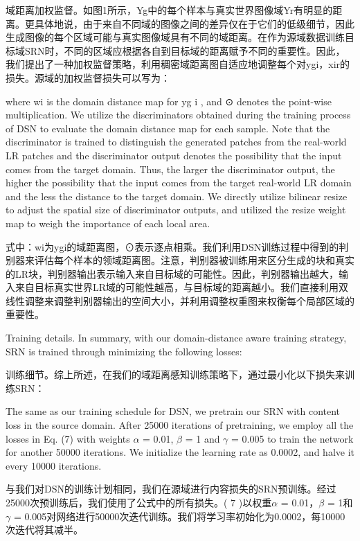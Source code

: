 域距离加权监督。如图1所示，Yg中的每个样本与真实世界图像域Yr有明显的距离。更具体地说，由于来自不同域的图像之间的差异仅在于它们的低级细节，因此生成图像的每个区域可能与真实图像域具有不同的域距离。在作为源域数据训练目标域SRN时，不同的区域应根据各自到目标域的距离赋予不同的重要性。因此，我们提出了一种加权监督策略，利用稠密域距离图自适应地调整每个对{ygi，xir}的损失。源域的加权监督损失可以写为：

where wi is the domain distance map for yg i , and ⊙ denotes the point-wise multiplication. We utilize the discriminators obtained during the training process of DSN to evaluate the domain distance map for each sample. Note that the discriminator is trained to distinguish the generated patches from the real-world LR patches and the discriminator output denotes the possibility that the input comes from the target domain. Thus, the larger the discriminator output, the higher the possibility that the input comes from the target real-world LR domain and the less the distance to the target domain. We directly utilize bilinear resize to adjust the spatial size of discriminator outputs, and utilized the resize weight map to weigh the importance of each local area.

式中：wi为ygi的域距离图，⊙表示逐点相乘。我们利用DSN训练过程中得到的判别器来评估每个样本的领域距离图。注意，判别器被训练用来区分生成的块和真实的LR块，判别器输出表示输入来自目标域的可能性。因此，判别器输出越大，输入来自目标真实世界LR域的可能性越高，与目标域的距离越小。我们直接利用双线性调整来调整判别器输出的空间大小，并利用调整权重图来权衡每个局部区域的重要性。

Training details. In summary, with our domain-distance aware training strategy, SRN is trained through minimizing the following losses:

训练细节。综上所述，在我们的域距离感知训练策略下，通过最小化以下损失来训练SRN：

The same as our training schedule for DSN, we pretrain our SRN with content loss in the source domain. After 25000 iterations of pretraining, we employ all the losses in Eq. (7) with weights $\alpha$ = 0.01, $\beta$ = 1 and $\gamma$ = 0.005 to train the network for another 50000 iterations. We initialize the learning rate as 0.0002, and halve it every 10000 iterations.

与我们对DSN的训练计划相同，我们在源域进行内容损失的SRN预训练。经过25000次预训练后，我们使用了公式中的所有损失。( 7 )以权重$\alpha$ = 0.01，$\beta$ = 1和$\gamma$ = 0.005对网络进行50000次迭代训练。我们将学习率初始化为0.0002，每10000次迭代将其减半。

